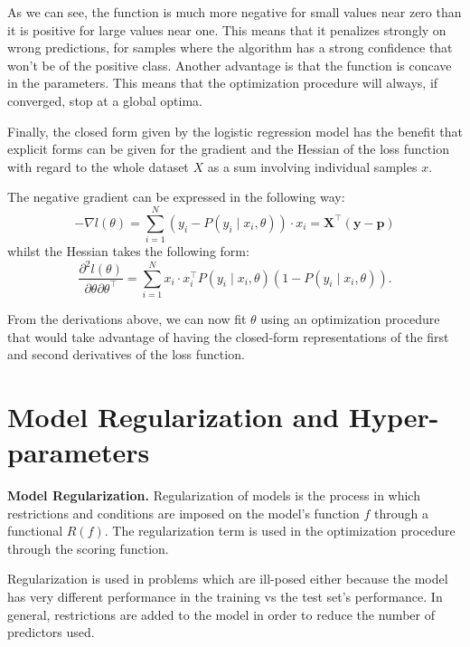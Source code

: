 As we can see, the function is much more negative for small values near zero than it is positive for large values near one. This means that it penalizes strongly on wrong predictions, for samples where the algorithm has a strong confidence that won't be of the positive class. Another advantage is that the function is concave in the parameters. This means that the optimization procedure will always, if converged, stop at a global optima.

Finally, the closed form given by the logistic regression model has the benefit that explicit forms can be given for the gradient and the Hessian of the loss function with regard to the whole dataset $X$ as a sum involving individual samples $x$.

The negative gradient can be expressed in the following way: %
\begin{equation}\label{eq:logitHessian1}
- \nabla l(\theta) = \sum_{i=1}^N (y_i - P(y_i \mid x_i,\theta))\cdot x_i = \textbf{X}^{\intercal}(\textbf{y}-\textbf{p})
\end{equation}
whilst the Hessian takes the following form:
\begin{equation}\label{eq:logitHessian2}
\frac{\partial^2 l(\theta)}{\partial \theta \partial \theta^\intercal} = \sum_{i=1}^N x_i \cdot x_i^\intercal P(y_i \mid x_i,\theta)(1 -P(y_i \mid x_i,\theta)) .
\end{equation}

From the derivations above, we can now fit $\theta$ using an optimization procedure that would take advantage of having the closed-form representations of the first and second derivatives of the loss function.


\section{Model Regularization and Hyper-parameters}\label{section-hyperParametersRegularization}


\begin{definition}\textbf{Model Regularization.}
Regularization of models is the process in which restrictions and conditions are imposed on the model's function $f$ through a functional $ R(f)$. The regularization term is used in the optimization procedure through the scoring function.
\end{definition}

Regularization is used in problems which are ill-posed either because the model has very different performance in the training vs the test set's performance. In general, restrictions are added to the model in order to reduce the number of predictors used.

